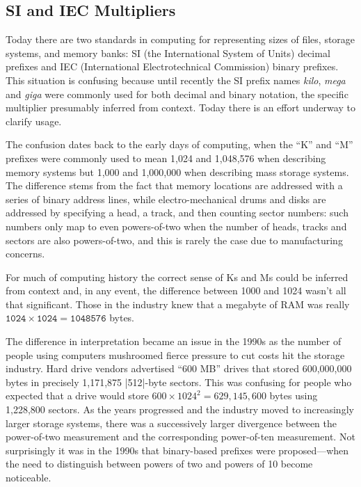 \subsection{SI and IEC Multipliers \DONE}\label{sec:si-and-iec}

Today there are two standards in computing for representing sizes of
files, storage systems, and memory banks: SI (the International System
of Units) decimal prefixes and IEC (International Electrotechnical
Commission) binary prefixes. This situation is confusing because until
recently the SI prefix names \emph{kilo}, \emph{mega} and \emph{giga} were commonly used
for both decimal and binary notation, the specific multiplier presumably
inferred from context. Today there is an effort underway to clarify
usage. 

The confusion dates back to the early days of computing, when the ``K''
and ``M'' prefixes were commonly used to mean 1,024 and 1,048,576
when describing memory systems but 1,000 and 1,000,000 when
describing mass storage systems. The difference stems
from the fact that memory locations are  addressed
with a series of binary address lines, while electro-mechanical drums and
disks are addressed by specifying a head, a track, and then counting
sector numbers: such numbers only map to even powers-of-two when the
number of heads, tracks and sectors are also powers-of-two, and
this is rarely the case due to manufacturing concerns.

For much of computing history the correct sense of Ks and Ms could be
inferred from context and, in any event, the difference between 1000
and 1024 wasn't all that significant. Those in the industry knew that
a megabyte of RAM was really $\texttt{1024}\times\texttt{1024}=\texttt{1048576}$ bytes.

The difference in interpretation became an issue in the 1990s as the
number of people using computers mushroomed fierce pressure to cut
costs hit the storage industry. Hard drive vendors 
advertised ``600 MB''
drives that stored 600,000,000 bytes in
precisely 1,171,875 |512|-byte sectors. This was confusing for people
who expected that a drive would store
$600\times1024^2=629,145,600$ bytes using 1,228,800
sectors. As the years progressed and the industry moved to
increasingly larger storage systems, there was a successively larger
divergence between the power-of-two measurement and the corresponding
power-of-ten measurement. Not surprisingly it was in the 1990s that binary-based prefixes were proposed---when the need to distinguish between powers of two and powers of 10 become noticeable.


